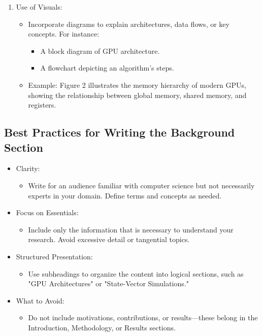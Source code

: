 \documentclass[conference]{IEEEtran}
\begin{document}
\begin{enumerate}
\item Use of Visuals:  
  \begin{itemize}
   \item Incorporate diagrams to explain architectures, data flows, or key concepts. For instance:  
    \begin{itemize}
     \item A block diagram of GPU architecture.  
     \item A flowchart depicting an algorithm's steps.  
    \end{itemize}
   \item Example: Figure 2 illustrates the memory hierarchy of modern GPUs, showing the relationship between global memory, shared memory, and registers.  
  \end{itemize}

\end{enumerate}

\subsection{Best Practices for Writing the Background Section}
\begin{itemize}
\item Clarity:  
\begin{itemize}
   \item Write for an audience familiar with computer science but not necessarily experts in your domain. Define terms and concepts as needed.  
\end{itemize}

\item Focus on Essentials:  
\begin{itemize}
   \item Include only the information that is necessary to understand your research. Avoid excessive detail or tangential topics.  
\end{itemize}

\item Structured Presentation:  
\begin{itemize}
   \item Use subheadings to organize the content into logical sections, such as "GPU Architectures" or "State-Vector Simulations."  
\end{itemize}

\item What to Avoid:  
\begin{itemize}
   \item Do not include motivations, contributions, or results—these belong in the Introduction, Methodology, or Results sections.  
\end{itemize}
\end{itemize}
\end{document}
